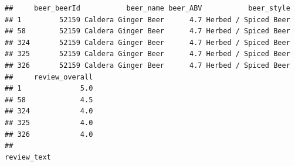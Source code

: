 \documentclass[
  a4paper,
]{article}
\begin{document}
\begin{verbatim}
##     beer_beerId           beer_name beer_ABV           beer_style
## 1         52159 Caldera Ginger Beer      4.7 Herbed / Spiced Beer
## 58        52159 Caldera Ginger Beer      4.7 Herbed / Spiced Beer
## 324       52159 Caldera Ginger Beer      4.7 Herbed / Spiced Beer
## 325       52159 Caldera Ginger Beer      4.7 Herbed / Spiced Beer
## 326       52159 Caldera Ginger Beer      4.7 Herbed / Spiced Beer
##     review_overall
## 1              5.0
## 58             4.5
## 324            4.0
## 325            4.0
## 326            4.0
##                                                                                                                                                                                                                                                                                                                                                                                                                                                                                                                                                                                                                                                                                                                                                                                                                                                                                                                                                                                                                                                                                                                                                                                                                                                                                                                                                                                                                                                                                                                                                                                                                                                                                                                                                                                                                                                                                                                                                                                                                                                                                                                                               review_text

\end{verbatim}
\end{document}

